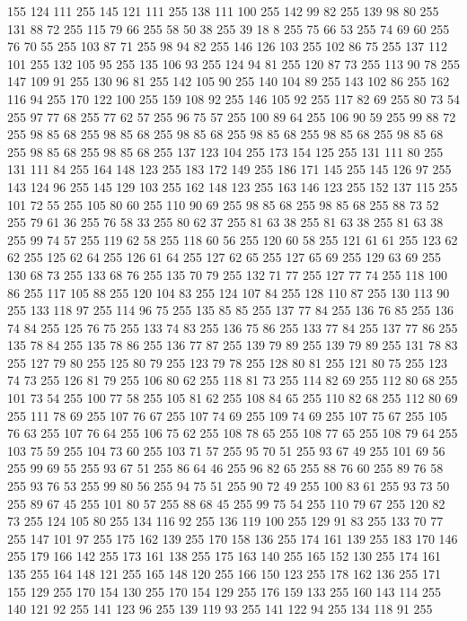 155 124 111 255 145 121 111 255 138 111 100 255 142 99 82 255 139 98 80 255 131 88 72 255 115 79 66 255 58 50 38 255 39 18 8 255 75 66 53 255 74 69 60 255 76 70 55 255 103 87 71 255 98 94 82 255 146 126 103 255 102 86 75 255 137 112 101 255 132 105 95 255 135 106 93 255 124 94 81 255 120 87 73 255 113 90 78 255 147 109 91 255 130 96 81 255 142 105 90 255 140 104 89 255 143 102 86 255 162 116 94 255 170 122 100 255 159 108 92 255 146 105 92 255 117 82 69 255 80 73 54 255 97 77 68 255 77 62 57 255 96 75 57 255 100 89 64 255 106 90 59 255 99 88 72 255 98 85 68 255 98 85 68 255 98 85 68 255 98 85 68 255 98 85 68 255 98 85 68 255 98 85 68 255 98 85 68 255 137 123 104 255 173 154 125 255 131 111 80 255 131 111 84 255 164 148 123 255 183 172 149 255 186 171 145 255 145 126 97 255 143 124 96 255 145 129 103 255 162 148 123 255 163 146 123 255 152 137 115 255 101 72 55 255 105 80 60 255 110 90 69 255 98 85 68 255
98 85 68 255 88 73 52 255 79 61 36 255 76 58 33 255 80 62 37 255 81 63 38 255 81 63 38 255 81 63 38 255 99 74 57 255 119 62 58 255 118 60 56 255 120 60 58 255 121 61 61 255 123 62 62 255 125 62 64 255 126 61 64 255 127 62 65 255 127 65 69 255 129 63 69 255 130 68 73 255 133 68 76 255 135 70 79 255 132 71 77 255 127 77 74 255 118 100 86 255 117 105 88 255 120 104 83 255 124 107 84 255 128 110 87 255 130 113 90 255 133 118 97 255 114 96 75 255 135 85 85 255 137 77 84 255 136 76 85 255 136 74 84 255 125 76 75 255 133 74 83 255 136 75 86 255 133 77 84 255 137 77 86 255 135 78 84 255 135 78 86 255 136 77 87 255 139 79 89 255 139 79 89 255 131 78 83 255 127 79 80 255 125 80 79 255 123 79 78 255 128 80 81 255 121 80 75 255 123 74 73 255 126 81 79 255 106 80 62 255 118 81 73 255 114 82 69 255 112 80 68 255 101 73 54 255 100 77 58 255 105 81 62 255 108 84 65 255 110 82 68 255 112 80 69 255
111 78 69 255 107 76 67 255 107 74 69 255 109 74 69 255 107 75 67 255 105 76 63 255 107 76 64 255 106 75 62 255 108 78 65 255 108 77 65 255 108 79 64 255 103 75 59 255 104 73 60 255 103 71 57 255 95 70 51 255 93 67 49 255 101 69 56 255 99 69 55 255 93 67 51 255 86 64 46 255 96 82 65 255 88 76 60 255 89 76 58 255 93 76 53 255 99 80 56 255 94 75 51 255 90 72 49 255 100 83 61 255 93 73 50 255 89 67 45 255 101 80 57 255 88 68 45 255 99 75 54 255 110 79 67 255 120 82 73 255 124 105 80 255 134 116 92 255 136 119 100 255 129 91 83 255 133 70 77 255 147 101 97 255 175 162 139 255 170 158 136 255 174 161 139 255 183 170 146 255 179 166 142 255 173 161 138 255 175 163 140 255 165 152 130 255 174 161 135 255 164 148 121 255 165 148 120 255 166 150 123 255 178 162 136 255 171 155 129 255 170 154 130 255 170 154 129 255 176 159 133 255 160 143 114 255 140 121 92 255 141 123 96 255 139 119 93 255 141 122 94 255 134 118 91 255
